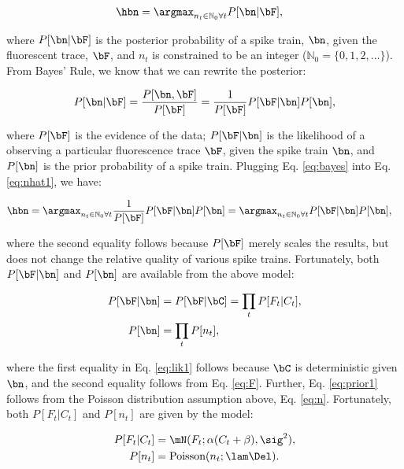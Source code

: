 \begin{align} \label{eq:nhat1} 
\hbn &=  \anx P[\bn | \bF], 
\end{align}

\noindent where $P[\bn | \bF]$ is the posterior probability of a spike train, $\bn$, given the fluorescent trace, $\bF$, and $n_t$ is constrained to be an integer ($\mathbb{N}_0=\{0,1,2,\ldots\}$).  From Bayes' Rule, we know that we can rewrite the posterior:

\begin{align} \label{eq:bayes}
P[\bn | \bF] = \frac{P[\bn, \bF]}{P[\bF]} = \frac{1}{P[\bF]} P[\bF | \bn] P[\bn],
\end{align}

\noindent where $P[\bF]$ is the evidence of the data; $P[\bF | \bn]$ is the likelihood of a observing a particular fluorescence trace $\bF$, given the spike train $\bn$, and $P[\bn]$ is the prior probability of a spike train.  Plugging Eq. \eqref{eq:bayes} into Eq. \eqref{eq:nhat1}, we have:

\begin{align} \label{eq:nhat2} 
\hbn &=  \anx \frac{1}{P[\bF]} P[\bF | \bn] P[\bn] =  \anx  P[\bF | \bn] P[\bn],
\end{align}

\noindent where the second equality follows because $P[\bF]$ merely scales the results, but does not change the relative quality of various spike trains.  Fortunately, both $P[\bF | \bn]$ and $P[\bn]$ are available from the above model:

\begin{subequations} \label{eq:post1}
\begin{align}
P[\bF | \bn]&= P[\bF | \bC] 	= \prod_t P[F_t | C_t], \label{eq:lik1} \\ 
P[\bn] 		&= \prod_t P[n_t], \label{eq:prior1}
\end{align}
\end{subequations}

\noindent where the first equality in Eq. \eqref{eq:lik1} follows because $\bC$ is deterministic given $\bn$, and the second equality follows from Eq. \eqref{eq:F}. Further, Eq. \eqref{eq:prior1} follows from the Poisson distribution assumption above, Eq. \eqref{eq:n}.  Fortunately, both $P[F_t | C_t]$ and $P[n_t]$ are given by the model:

\begin{subequations} \label{eq:post2}
\begin{align}
P[F_t | C_t] &= \mN(F_t; \alpha(C_t+\beta),\sig^2), \label{eq:lik2} \\
P[n_t] &= \text{Poisson}(n_t; \lam \Del). \label{eq:prior2} 
\end{align}
\end{subequations}

